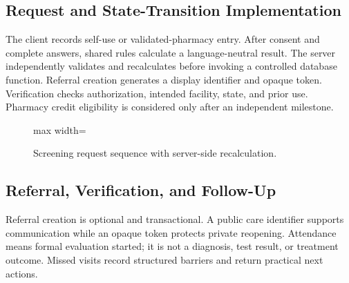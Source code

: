 \documentclass[12pt,onecolumn]{IEEEtran}
\begin{document}
\subsection{Request and State-Transition Implementation}
The client records self-use or validated-pharmacy entry. After consent and complete answers, shared rules calculate a language-neutral result. The server independently validates and recalculates before invoking a controlled database function. Referral creation generates a display identifier and opaque token. Verification checks authorization, intended facility, state, and prior use. Pharmacy credit eligibility is considered only after an independent milestone.

\begin{figure}[H]
\centering
\begin{adjustbox}{max width=\textwidth}
\end{adjustbox}
\caption{Screening request sequence with server-side recalculation.}\label{fig:sequence}
\end{figure}

\subsection{Referral, Verification, and Follow-Up}
Referral creation is optional and transactional. A public care identifier supports communication while an opaque token protects private reopening. Attendance means formal evaluation started; it is not a diagnosis, test result, or treatment outcome. Missed visits record structured barriers and return practical next actions.
\end{document}
